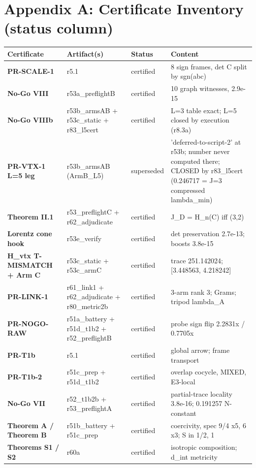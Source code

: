 \documentclass[11pt,a4paper]{article}
\theoremstyle{definition}
\begin{document}
\section*{Appendix A: Certificate Inventory (status column)}
\small
\begin{tabularx}{\linewidth}{l l l X}
\toprule
\textbf{Certificate} & \textbf{Artifact(s)} & \textbf{Status} & \textbf{Content} \\
\midrule
\textbf{PR-SCALE-1} & r5.1 & certified & 8 sign frames, det C split by sgn(abc) \\
\textbf{No-Go VIII} & r53a\_preflightB & certified & 10 graph witnesses, 2.9e-15 \\
\textbf{No-Go VIIIb} & r53b\_armsAB + r53c\_static + r83\_l5cert & certified & L=3 table exact; L=5 closed by execution (r8.3a) \\
\textbf{PR-VTX-1 L=5 leg} & r53b\_armsAB (ArmB\_L5) & superseded & 'deferred-to-script-2' at r53b; number never computed there; CLOSED by r83\_l5cert (0.246717 = J=3 compressed lambda\_min) \\
\textbf{Theorem II.1} & r53\_preflightC + r62\_adjudicate & certified & J\_D = H\_n(C) iff (3,2) \\
\textbf{Lorentz cone hook} & r53e\_verify & certified & det preservation 2.7e-13; boosts 3.8e-15 \\
\textbf{H\_vtx T-MISMATCH + Arm C} & r53c\_static + r53c\_armC & certified & trace 251.142024; [3.448563, 4.218242] \\
\textbf{PR-LINK-1} & r61\_link1 + r62\_adjudicate + r80\_metric2b & certified & 3-arm rank 3; Grams; tripod lambda\_A \\
\textbf{PR-NOGO-RAW} & r51a\_battery + r51d\_t1b2 + r52\_preflightB & certified & probe sign flip 2.2831x / 0.7705x \\
\textbf{PR-T1b} & r5.1 & certified & global arrow; frame transport \\
\textbf{PR-T1b-2} & r51c\_prep + r51d\_t1b2 & certified & overlap cocycle, MIXED, E3-local \\
\textbf{No-Go VII} & r52\_t1b2b + r53\_preflightA & certified & partial-trace locality 3.8e-16; 0.191257 N-constant \\
\textbf{Theorem A / Theorem B} & r51b\_battery + r51c\_prep & certified & coercivity, spec {9/4 x5, 6 x3}; S in {1/2, 1} \\
\textbf{Theorems S1 / S2} & r60a & certified & isotropic composition; d\_int metricity \\

\end{tabularx}
\end{document}
